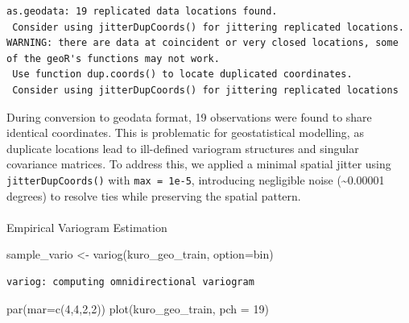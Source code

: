 \documentclass[
  11pt,
]{article}
\makeatletter
\let\oldparagraph\paragraph
\renewcommand{\paragraph}{
    \@ifstar
      \xxxParagraphStar
      \xxxParagraphNoStar
  }
\newcommand{\xxxParagraphStar}[1]{\oldparagraph*{#1}\mbox{}}
\newcommand{\xxxParagraphNoStar}[1]{\oldparagraph{#1}\mbox{}}
\newenvironment{Shaded}{\begin{snugshade}}{\end{snugshade}}
\newcommand{\AttributeTok}[1]{\textcolor[rgb]{0.40,0.45,0.13}{#1}}
\newcommand{\DecValTok}[1]{\textcolor[rgb]{0.68,0.00,0.00}{#1}}
\newcommand{\FunctionTok}[1]{\textcolor[rgb]{0.28,0.35,0.67}{#1}}
\newcommand{\NormalTok}[1]{\textcolor[rgb]{0.00,0.23,0.31}{#1}}
\newcommand{\OtherTok}[1]{\textcolor[rgb]{0.00,0.23,0.31}{#1}}
\newcommand{\StringTok}[1]{\textcolor[rgb]{0.13,0.47,0.30}{#1}}
\makeatother
\begin{document}
\begin{verbatim}
as.geodata: 19 replicated data locations found. 
 Consider using jitterDupCoords() for jittering replicated locations. 
WARNING: there are data at coincident or very closed locations, some of the geoR's functions may not work.
 Use function dup.coords() to locate duplicated coordinates.
 Consider using jitterDupCoords() for jittering replicated locations 
\end{verbatim}

During conversion to geodata format, 19 observations were found to share
identical coordinates. This is problematic for geostatistical modelling,
as duplicate locations lead to ill-defined variogram structures and
singular covariance matrices. To address this, we applied a minimal
spatial jitter using \texttt{jitterDupCoords()} with
\texttt{max\ =\ 1e-5}, introducing negligible noise
(\textasciitilde0.00001 degrees) to resolve ties while preserving the
spatial pattern.

\paragraph{Empirical Variogram
Estimation}\label{empirical-variogram-estimation}

\begin{Shaded}
\begin{Highlighting}[]
\NormalTok{ sample\_vario }\OtherTok{\textless{}{-}} \FunctionTok{variog}\NormalTok{(kuro\_geo\_train, }\AttributeTok{option=}\StringTok{\textquotesingle{}bin\textquotesingle{}}\NormalTok{)}
\end{Highlighting}
\end{Shaded}

\begin{verbatim}
variog: computing omnidirectional variogram
\end{verbatim}

\begin{Shaded}
\begin{Highlighting}[]
 \FunctionTok{par}\NormalTok{(}\AttributeTok{mar=}\FunctionTok{c}\NormalTok{(}\DecValTok{4}\NormalTok{,}\DecValTok{4}\NormalTok{,}\DecValTok{2}\NormalTok{,}\DecValTok{2}\NormalTok{))}
 \FunctionTok{plot}\NormalTok{(kuro\_geo\_train, }\AttributeTok{pch =} \DecValTok{19}\NormalTok{)}
\end{Highlighting}
\end{Shaded}
\end{document}
